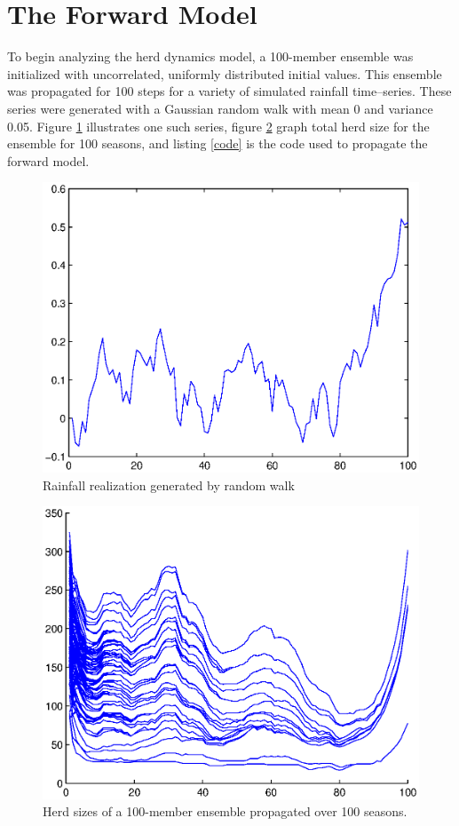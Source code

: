 \documentclass[letterpaper]{tufte-handout}
\begin{document}
\section{The Forward Model}

To begin analyzing the herd dynamics model, a 100-member ensemble was initialized with uncorrelated, uniformly distributed initial values. This ensemble was propagated for 100 steps for a variety of simulated rainfall time--series. These series were generated with a Gaussian random walk with mean 0 and variance 0.05. Figure \ref{rfe} illustrates one such series, figure \ref{ensemble} graph total herd size for the ensemble for 100 seasons, and listing \ref{code} is the code used to propagate the forward model.

\begin{figure}
  \includegraphics[width=\textwidth]{rfe}
  \caption{Rainfall realization generated by random walk}
  \label{rfe}
\end{figure}
\begin{figure}
  \includegraphics[width=\textwidth]{herdsize}
  \caption{Herd sizes of a 100-member ensemble propagated over 100 seasons.}
  \label{ensemble}
\end{figure}

\newpage
{\scriptsize
  
  \label{code}
}



\end{document}
